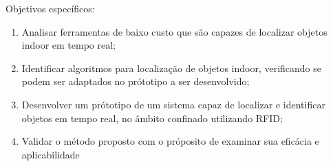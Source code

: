 Objetivos específicos:
\begin{enumerate}

    \item Analisar ferramentas de baixo custo que são capazes de localizar objetos indoor em tempo real;
    
    \item Identificar algoritmos para localização de objetos indoor, verificando se podem ser adaptados no prótotipo a ser desenvolvido;
    
    
    
    \item Desenvolver um prótotipo de um sistema capaz de localizar e identificar objetos em tempo real, no âmbito confinado utilizando RFID;
    
    \item Validar o método proposto com o próposito de examinar sua eficácia e aplicabilidade
\end{enumerate}


\begin{comment}
\section{Metodologia Proposta}

\section{Contribuições propostas}
As contribuições propostas deste trabalho são:
\begin{enumerate}
    \item A implementação de um sistema para localização de objetos. O Metódo utilizado visa localizar objeto sem alta precisão, porém é viável para controle de acervos.
    \item O sistema desevolvido pode auxiliar no controle e ainda facilitar o levantamento de todos os bens do proprietário.
\end{enumerate}

\end{comment}
